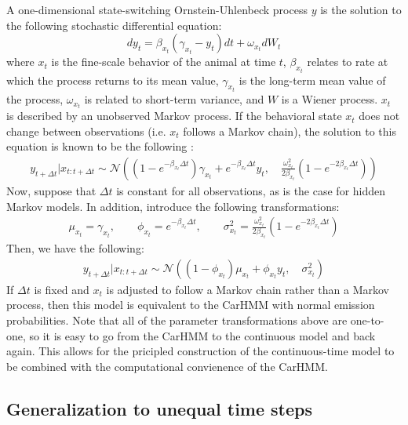 A one-dimensional state-switching Ornstein-Uhlenbeck process $y$ is the solution to the following stochastic differential equation:
%
$$dy_t = \beta_{x_t}(\gamma_{x_t} - y_t)dt + \omega_{x_t} dW_t$$
%
where $x_t$ is the fine-scale behavior of the animal at time $t$, $\beta_{x_t}$ relates to rate at which the process returns to its mean value, $\gamma_{x_t}$ is the long-term mean value of the process, $\omega_{x_t}$ is related to short-term variance, and $W$ is a Wiener process. $x_t$ is described by an unobserved Markov process. If the behavioral state $x_t$ does not change between observations (i.e. $x_t$ follows a Markov chain), the solution to this equation is known to be the following \cite{Michelot:2019}:
\begin{align*}
y_{t+\Delta t} | x_{t:t+\Delta t} \sim \mathcal{N}\left((1-e^{-\beta_{x_t}\Delta t})\gamma_{x_t} + e^{-\beta_{x_t}\Delta t} y_t,\quad \frac{\omega_{x_t}^2}{2\beta_{x_t}} (1-e^{-2\beta_{x_t}\Delta t})\right)
\end{align*}
Now, suppose that $\Delta t$ is constant for all observations, as is the case for hidden Markov models. In addition, introduce the following transformations:
\begin{align}
\mu_{x_t} = \gamma_{x_t}, \qquad \phi_{x_t} = e^{-\beta_{x_t}\Delta t}, \qquad \sigma^2_{x_t} = \frac{\omega_{x_t}^2}{2\beta_{x_t}} (1-e^{-2\beta_{x_t}\Delta t})
\label{CarHMM_to_OU}
\end{align}
Then, we have the following:
\begin{align*}
y_{t+\Delta t} | x_{t:t+\Delta t} \sim \mathcal{N}\left((1-\phi_{x_t})\mu_{x_t} + \phi_{x_t} y_t,\quad \sigma_{x_t}^2 \right)
\end{align*}
%
If $\Delta t$ is fixed and $x_t$ is adjusted to follow a Markov chain rather than a Markov process, then this model is equivalent to the CarHMM with normal emission probabilities. Note that all of the parameter transformations above are one-to-one, so it is easy to go from the CarHMM to the continuous model and back again. This allows for the pricipled construction of the continuous-time model to be combined with the computational convienence of the CarHMM.

\subsection{Generalization to unequal time steps}

